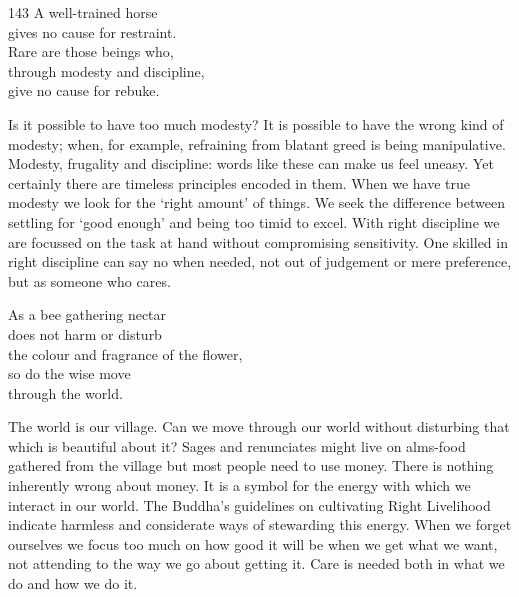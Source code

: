 
\begin{dhpVerse}{143}
\label{dhp-143}
A well-trained horse\\
gives no cause for restraint.\\
Rare are those beings who,\\
through modesty and discipline,\\
give no cause for rebuke.
\end{dhpVerse}

\begin{dhpRefl}

Is it possible to have too much modesty? It is possible to have the
wrong kind of modesty; when, for example, refraining from blatant
greed is being manipulative. Modesty, frugality and discipline: words
like these can make us feel uneasy. Yet certainly there are timeless
principles encoded in them. When we have true modesty we look for the
`right amount' of things. We seek the difference between settling for
`good enough' and being too timid to excel. With right discipline we
are focussed on the task at hand without compromising sensitivity.
One skilled in right discipline can say no when needed, not out of
judgement or mere preference, but as someone who cares.

\end{dhpRefl}


\begin{dhpVerse}{49}
\label{dhp-49}
As a bee gathering nectar\\
does not harm or disturb\\
the colour and fragrance of the flower,\\
so do the wise move\\
through the world.
\end{dhpVerse}

\begin{dhpRefl}

The world is our village. Can we move through our world without
disturbing that which is beautiful about it? Sages and renunciates
might live on alms-food gathered from the village but most people
need to use money. There is nothing inherently wrong about money. It
is a symbol for the energy with which we interact in our world. The
Buddha's guidelines on cultivating Right Livelihood indicate harmless
and considerate ways of stewarding this energy. When we forget
ourselves we focus too much on how good it will be when we get what
we want, not attending to the way we go about getting it. Care is
needed both in what we do and how we do it.

\end{dhpRefl}

